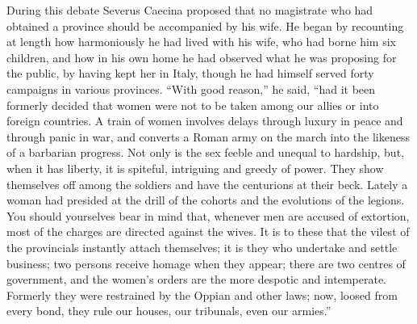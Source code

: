 
During this debate Severus Caecina proposed that no magistrate who had obtained a province should be accompanied by his wife. He began by recounting at length how harmoniously he had lived with his wife, who had borne him six children, and how in his own home he had observed what he was proposing for the public, by having kept her in Italy, though he had himself served forty campaigns in various provinces. ``With good reason,'' he said, ``had it been formerly decided that women were not to be taken among our allies or into foreign countries. A train of women involves delays through luxury in peace and through panic in war, and converts a Roman army on the march into the likeness of a barbarian progress. Not only is the sex feeble and unequal to hardship, but, when it has liberty, it is spiteful, intriguing and greedy of power. They show themselves off among the soldiers and have the centurions at their beck. Lately a woman had presided at the drill of the cohorts and the evolutions of the legions. You should yourselves bear in mind that, whenever men are accused of extortion, most of the charges are directed against the wives. It is to these that the vilest of the provincials instantly attach themselves; it is they who undertake and settle business; two persons receive homage when they appear; there are two centres of government, and the women's orders are the more despotic and intemperate. Formerly they were restrained by the Oppian and other laws; now, loosed from every bond, they rule our houses, our tribunals, even our armies.''


